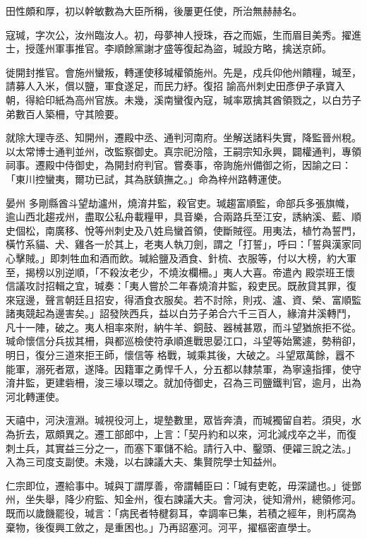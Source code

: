 \begin{pinyinscope}
 田性頗和厚，初以幹敏數為大臣所稱，後屢更任使，所治無赫赫名。



 寇瑊，字次公，汝州臨汝人。初，母夢神人授珠，吞之而娠，生而眉目美秀。擢進士，授蓬州軍事推官。李順餘黨謝才盛等復起為盜，瑊設方略，擒送京師。



 徙開封推官。會施州蠻叛，轉運使移瑊權領施州。先是，戍兵仰他州饋糧，瑊至，請募人入米，償以鹽，軍食遂足，而民力紓。復招
 諭高州刺史田彥伊子承寶入朝，得給印紙為高州官族。未幾，溪南蠻復內寇，瑊率眾擒其酋領戮之，以白芀子弟數百人築柵，守其險要。



 就除大理寺丞、知開州，遷殿中丞、通判河南府。坐解送諸料失實，降監晉州稅。以太常博士通判並州，改監察御史。真宗祀汾陰，王嗣宗知永興，闢權通判，專領祠事。遷殿中侍御史，為開封府判官。嘗奏事，帝詢施州備御之術，因諭之曰：「東川控蠻夷，爾功已試，其為朕鎮撫之。」命為梓州路轉運使。



 晏州
 多剛縣酋斗望劫瀘州，燒淯井監，殺官吏。瑊趨富順監，命部兵多張旗幟，逾山西北趨戎州，盡取公私舟載糧甲，具音樂，合兩路兵至江安，誘納溪、藍、順史個松，南廣移、悅等州刺史及八姓烏蠻首領，使斷賊徑。用夷法，植竹為誓門，橫竹系貓、犬、雞各一於其上，老夷人執刀劍，謂之「打誓」，呼曰：「誓與漢家同心擊賊。」即刺牲血和酒而飲。瑊給鹽及酒食、針梳、衣服等，付以大榜，約大軍至，揭榜以別逆順，「不殺汝老少，不燒汝欄柵。」夷人大喜。帝遣內
 殿崇班王懷信議攻討招輯之宜，瑊奏：「夷人嘗於二年春燒淯井監，殺吏民。既赦貸其罪，復來寇邊，聲言朝廷且招安，得酒食衣服矣。若不討除，則戎、瀘、資、榮、富順監諸夷競起為邊害矣。」詔發陜西兵，益以白芀子弟合六千三百人，緣淯井溪轉鬥，凡十一陣，破之。夷人相率來附，納牛羊、銅鼓、器械甚眾，而斗望猶旅拒不從。瑊命懷信分兵拔其柵，與都巡檢使符承順進戰思晏江口，斗望等始驚遽，勢稍卻，明日，復分三道來拒王師，懷信等
 格戰，瑊乘其後，大破之。斗望眾萬餘，囂不能軍，溺死者眾，遂降。因籍軍之勇悍千人，分五都以隸禁軍，為寧遠指揮，使守淯井監，更建砦柵，浚三壕以環之。就加侍御史，召為三司鹽鐵判官，逾月，出為河北轉運使。



 天禧中，河決澶淵。瑊視役河上，堤墊數里，眾皆奔潰，而瑊獨留自若。須臾，水為折去，眾頗異之。遷工部郎中，上言：「契丹約和以來，河北減戍卒之半，而復刺土兵，其實益三分之一，而塞下軍儲不給。請行入中、鑿頭、便糴三說之法。」
 入為三司度支副使。未幾，以右諫議大夫、集賢院學士知益州。



 仁宗即位，遷給事中。瑊與丁謂厚善，帝謂輔臣曰：「瑊有吏乾，毋深譴也。」徙鄧州，坐失舉，降少府監、知金州，復右諫議大夫。會河決，徙知滑州，總領修河。既而以歲饑罷役，瑊言：「病民者特楗芻耳，幸調率已集，若積之經年，則朽腐為棄物，後復興工斂之，是重困也。」乃再詔塞河。河平，擢樞密直學士。




\end{pinyinscope}
